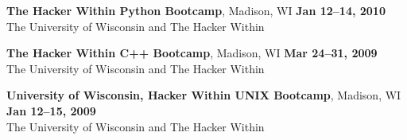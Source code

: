 \documentclass[margin,line]{resume}
\begin{document}
\begin{resume}
    \textbf{The Hacker Within Python Bootcamp}, Madison, WI \hfill \textbf{Jan 12--14, 2010}\\
               The University of Wisconsin and The Hacker Within

    \textbf{The Hacker Within C++ Bootcamp}, Madison, WI \hfill \textbf{Mar 24--31, 2009}\\
               The University of Wisconsin and The Hacker Within

    \textbf{University of Wisconsin, Hacker Within UNIX Bootcamp}, Madison, WI \hfill \textbf{Jan 12--15, 2009}\\
               The University of Wisconsin and The Hacker Within


\end{resume}
\end{document}
